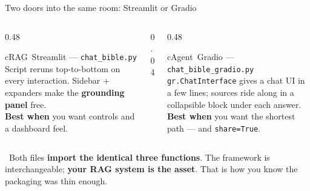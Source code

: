 \begin{frame}{Two doors into the same room: Streamlit or Gradio}
  \begin{columns}[t, totalwidth=\textwidth]
    \begin{column}{0.48\textwidth}
      \begin{featbox}{cRAG}{\faStream\ Streamlit --- \texttt{chat\_bible.py}}
        \scriptsize
        Script reruns top-to-bottom on every interaction. Sidebar + expanders make
        the \textbf{grounding panel} free.
        \\[3pt]\textbf{Best when} you want controls and a dashboard feel.
      \end{featbox}
    \end{column}
    \begin{column}{0.04\textwidth}\end{column}
    \begin{column}{0.48\textwidth}
      \begin{featbox}{cAgent}{\faRobot\ Gradio --- \texttt{chat\_bible\_gradio.py}}
        \scriptsize
        \texttt{gr.ChatInterface} gives a chat UI in a few lines; sources ride along
        in a collapsible block under each answer.
        \\[3pt]\textbf{Best when} you want the shortest path --- and \texttt{share=True}.
      \end{featbox}
    \end{column}
  \end{columns}
  \vspace{8pt}
  \begin{calloutbox}[cEval]
    \small\faProjectDiagram\ Both files \textbf{import the identical three functions}. The
    framework is interchangeable; \textbf{your RAG system is the asset}. That is how you
    know the packaging was thin enough.
  \end{calloutbox}
\end{frame}

